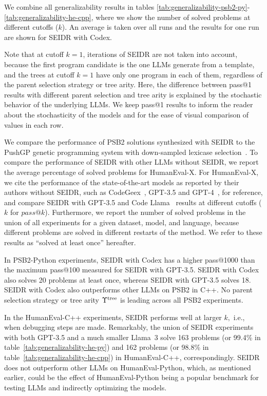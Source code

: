 We combine all generalizability results in tables \ref{tab:generalizability-psb2-py}-\ref{tab:generalizability-he-cpp}, where we show the number of solved problems at different cutoffs ($k$). 
An average is taken over all runs and the results for one run are shown for SEIDR with Codex. 

Note that at cutoff $k=1$, iterations of SEIDR are not taken into account, because the first program candidate is the one LLMs generate from a template, and the trees at cutoff $k=1$ have only one program in each of them, regardless of the parent selection strategy or tree arity. 
Here, the difference between pass@1 results with different parent selection and tree arity is explained by the stochastic behavior of the underlying LLMs. 
We keep pass@1 results to inform the reader about the stochasticity of the models and for the ease of visual comparison of values in each row.

We compare the performance of PSB2 solutions synthesized with SEIDR to the PushGP genetic programming system with down-sampled lexicase selection~\cite{helmuth2022:problemsolving}. 
To compare the performance of SEIDR with other LLMs without SEIDR, we report the average percentage of solved problems for HumanEval-X. 
For HumanEval-X, we cite the performance of the state-of-the-art models as reported by their authors without SEIDR, such as CodeGeex~\cite{zheng2023:codegeex}, GPT-3.5 and GPT-4~\cite{achiamGpt4TechnicalReport2023}, for reference, and compare SEIDR with GPT-3.5 and Code Llama~\cite{roziereCodeLlamaOpen2024} results at different cutoffs ($k$ for $pass@k$).
Furthermore, we report the number of solved problems in the union of all experiments for a given dataset, model, and language, because different problems are solved in different restarts of the method. 
We refer to these results as ``solved at least once'' hereafter.

In PSB2-Python experiments, SEIDR with Codex has a higher pass@1000 than the maximum pass@100 measured for SEIDR with GPT-3.5. SEIDR with Codex also solves 20 problems at least once, whereas SEIDR with GPT-3.5 solves 18.
SEIDR with Codex also outperforms other LLMs on PSB2 in C++.
No parent selection strategy or tree arity $\Upsilon^\text{tree}$ is leading across all PSB2 experiments. 

In the HumanEval-C++ experiments, SEIDR performs well at larger $k,$ i.e., when debugging steps are made. 
Remarkably, the union of SEIDR experiments with both GPT-3.5 and a much smaller Llama~3 solve 163 problems (or 99.4\% in table~\ref{tab:generalizability-he-py}) and 162 problems (or 98.8\% in table~\ref{tab:generalizability-he-cpp}) in HumanEval-C++, correspondingly.
SEIDR does not outperform other LLMs on HumanEval-Python, which, as mentioned earlier, could be the effect of HumanEval-Python being a popular benchmark for testing LLMs and indirectly optimizing the models.

